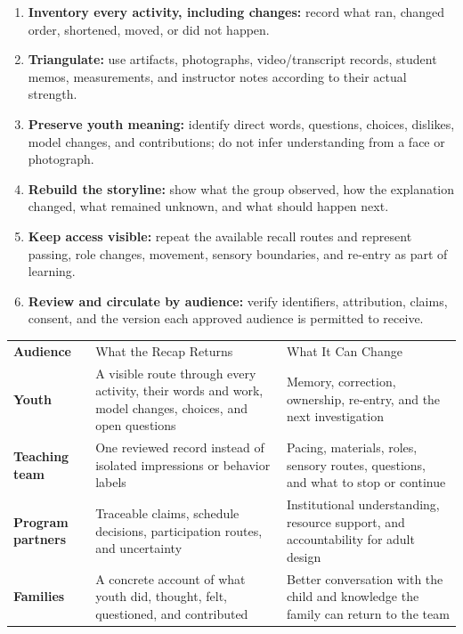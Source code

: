 \newpage
\small
{}

\begin{enumerate}
  \item \textbf{Inventory every activity, including changes:} record what ran, changed order, shortened, moved, or did not happen.
  \item \textbf{Triangulate:} use artifacts, photographs, video/transcript records, student memos, measurements, and instructor notes according to their actual strength.
  \item \textbf{Preserve youth meaning:} identify direct words, questions, choices, dislikes, model changes, and contributions; do not infer understanding from a face or photograph.
  \item \textbf{Rebuild the storyline:} show what the group observed, how the explanation changed, what remained unknown, and what should happen next.
  \item \textbf{Keep access visible:} repeat the available recall routes and represent passing, role changes, movement, sensory boundaries, and re-entry as part of learning.
  \item \textbf{Review and circulate by audience:} verify identifiers, attribution, claims, consent, and the version each approved audience is permitted to receive.
\end{enumerate}


\small
\renewcommand{\arraystretch}{1.08}
\setlength{\tabcolsep}{4pt}
\begin{tabularx}{\textwidth}{>{\bfseries\RaggedRight\arraybackslash}p{1.10in} >{\RaggedRight\arraybackslash}p{2.45in} >{\RaggedRight\arraybackslash}X}
\rowcolor{MidTeal}
\color{white}Audience & \color{white}What the Recap Returns & \color{white}What It Can Change \\
Youth & A visible route through every activity, their words and work, model changes, choices, and open questions & Memory, correction, ownership, re-entry, and the next investigation \\
\rowcolor{SoftGray}
Teaching team & One reviewed record instead of isolated impressions or behavior labels & Pacing, materials, roles, sensory routes, questions, and what to stop or continue \\
Program partners & Traceable claims, schedule decisions, participation routes, and uncertainty & Institutional understanding, resource support, and accountability for adult design \\
\rowcolor{SoftGray}
Families & A concrete account of what youth did, thought, felt, questioned, and contributed & Better conversation with the child and knowledge the family can return to the team \\
\end{tabularx}
\small

